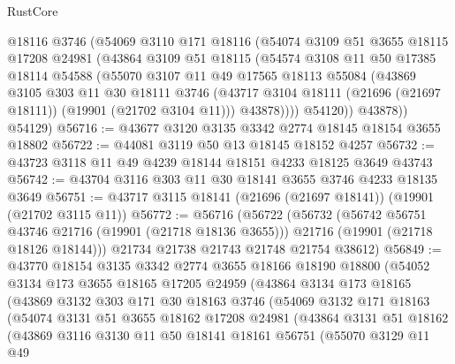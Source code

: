 \begin{lexlean}{RustCore}
\begin{coremodule}
          @18116
          @3746
          (@54069
            @3110
            @171
            @18116
            (@54074
              @3109
              @51
              @3655
              @18115
              @17208
              @24981
              (@43864
                @3109
                @51
                @18115
                (@54574
                  @3108
                  @11
                  @50
                  @17385
                  @18114
                  @54588
                  (@55070
                    @3107
                    @11
                    @49
                    @17565
                    @18113
                    @55084
                    (@43869
                      @3105
                      @303
                      @11
                      @30
                      @18111
                      @3746
                      (@43717 @3104 @18111 (@21696 (@21697 @18111)) (@19901 (@21702 @3104 @11)))
                      @43878))))
              @54120))
          @43878))
      @54129)
@56716 := @43677 @3120 @3135 @3342 @2774 @18145 @18154 @3655 @18802
@56722 := @44081 @3119 @50 @13 @18145 @18152 @4257
@56732 := @43723 @3118 @11 @49 @4239 @18144 @18151 @4233 @18125 @3649 @43743
@56742 := @43704 @3116 @303 @11 @30 @18141 @3655 @3746 @4233 @18135 @3649
@56751 := @43717 @3115 @18141 (@21696 (@21697 @18141)) (@19901 (@21702 @3115 @11))
@56772 := @56716
    (@56722
      (@56732
        (@56742 @56751 @43746 @21716 (@19901 (@21718 @18136 @3655)))
        @21716
        (@19901 (@21718 @18126 @18144)))
      @21734
      @21738
      @21743
      @21748
      @21754
      @38612)
@56849 := @43770
    @18154
    @3135
    @3342
    @2774
    @3655
    @18166
    @18190
    @18800
    (@54052
      @3134
      @173
      @3655
      @18165
      @17205
      @24959
      (@43864
        @3134
        @173
        @18165
        (@43869
          @3132
          @303
          @171
          @30
          @18163
          @3746
          (@54069
            @3132
            @171
            @18163
            (@54074
              @3131
              @51
              @3655
              @18162
              @17208
              @24981
              (@43864
                @3131
                @51
                @18162
                (@43869
                  @3116
                  @3130
                  @11
                  @50
                  @18141
                  @18161
                  @56751
                  (@55070
                    @3129
                    @11
                    @49

\end{coremodule}
\end{lexlean}
